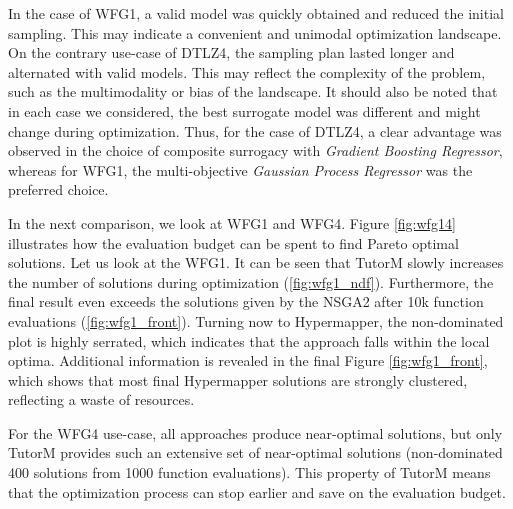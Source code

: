     
    In the case of WFG1, a valid model was quickly obtained and reduced the initial sampling. This may indicate a convenient and unimodal optimization landscape. On the contrary use-case of DTLZ4, the sampling plan lasted longer and alternated with valid models. This may reflect the complexity of the problem, such as the multimodality or bias of the landscape. It should also be noted that in each case we considered, the best surrogate model was different and might change during optimization. Thus, for the case of DTLZ4, a clear advantage was observed in the choice of composite surrogacy with \emph{Gradient Boosting Regressor}, whereas for WFG1, the multi-objective \emph{Gaussian Process Regressor} was the preferred choice.


    In the next comparison, we look at WFG1 and WFG4. Figure \ref{fig:wfg14} illustrates how the evaluation budget can be spent to find Pareto optimal solutions. Let us look at the WFG1. It can be seen that TutorM slowly increases the number of solutions during optimization (\ref{fig:wfg1_ndf}). Furthermore, the final result even exceeds the solutions given by the NSGA2 after 10k function evaluations (\ref{fig:wfg1_front}). Turning now to Hypermapper, the non-dominated plot is highly serrated, which indicates that the approach falls within the local optima. Additional information is revealed in the final Figure \ref{fig:wfg1_front}, which shows that most final Hypermapper solutions are strongly clustered, reflecting a waste of resources.

    For the WFG4 use-case, all approaches produce near-optimal solutions, but only TutorM provides such an extensive set of near-optimal solutions (non-dominated 400 solutions from 1000 function evaluations). This property of TutorM means that the optimization process can stop earlier and save on the evaluation budget.

